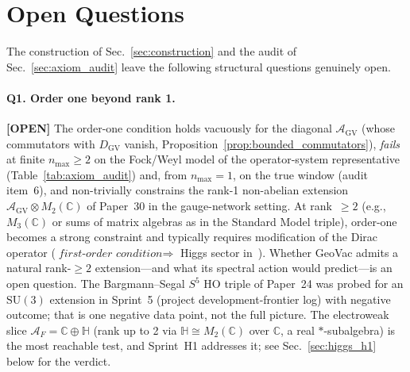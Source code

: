 \documentclass[11pt]{article}
\begin{document}
\section{Open Questions}
\label{sec:open}

The construction of Sec.~\ref{sec:construction} and the audit of
Sec.~\ref{sec:axiom_audit} leave the following structural questions
genuinely open.

\paragraph{Q1.  Order one beyond rank 1.}  \textbf{[OPEN]}  The order-one condition
holds vacuously for the diagonal $\mathcal{A}_{\mathrm{GV}}$ (whose
commutators with $D_{\mathrm{GV}}$ vanish,
Proposition~\ref{prop:bounded_commutators}), \emph{fails} at finite
$n_{\max} \ge 2$ on the Fock/Weyl model of the operator-system
representative (Table~\ref{tab:axiom_audit}) and, from $n_{\max} = 1$,
on the true window (audit item~6), and non-trivially constrains the rank-1
non-abelian extension $\mathcal{A}_{\mathrm{GV}} \otimes M_2(\mathbb{C})$
of Paper~30 in the gauge-network setting.  At
rank~$\ge 2$ (e.g., $M_3(\mathbb{C})$ or sums of matrix algebras as in
the Standard Model triple), order-one becomes a strong constraint and
typically requires modification of the Dirac operator
($\textit{first-order condition} \Rightarrow$ Higgs sector
in~\cite{chamseddine_connes1997_2008}).  Whether GeoVac admits a natural
rank-$\ge 2$ extension---and what its spectral action would predict---is
an open question.  The Bargmann--Segal $S^5$ HO triple of
Paper~24 was probed for an $\mathrm{SU}(3)$ extension in
Sprint~5 (project development-frontier log) with negative outcome; that is one negative
data point, not the full picture.  The electroweak slice
$\mathcal{A}_F = \mathbb{C} \oplus \mathbb{H}$ (rank up to 2 via
$\mathbb{H} \cong M_2(\mathbb{C})$ over $\mathbb{C}$, a real
$*$-subalgebra) is the most reachable test, and Sprint~H1
addresses it; see Sec.~\ref{sec:higgs_h1} below for the verdict.
\end{document}
